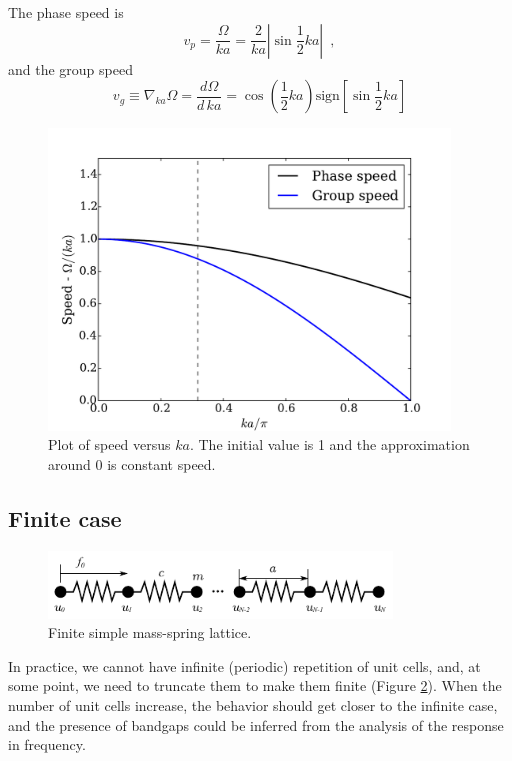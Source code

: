 \documentclass[12pt,letterpaper]{article}
\begin{document}
The phase speed is
\[v_p = \frac{\Omega}{ka} = \frac{2}{ka}\left\vert \sin \frac{1}{2} ka\right\vert \enspace ,\]
and the group speed
\[v_g \equiv \nabla_{ka}\Omega = \frac{d\Omega}{d\, ka} = \cos \left(\frac{1}{2} ka\right) \text{sign}\left[\sin \frac{1}{2} ka\right] \]

\begin{figure}[h]
\centering
\includegraphics[height=8cm]{img/spring-mass-speeds.pdf} 
\caption{Plot of speed versus $ka$. The initial value is 1 and the approximation around 0 is constant speed.}
\label{fig:spring-mass-speed}
\end{figure}



\subsection{Finite case}
\begin{figure}[h]
\centering
\includegraphics[height=1.8cm]{img/spring-mass-finite.pdf} 
\caption{Finite simple mass-spring lattice.}\label{fig:spring-mass-finite}
\end{figure}
In practice, we cannot have infinite (periodic) repetition of unit cells, and, at some point, we need to truncate them to make them finite (Figure \ref{fig:spring-mass-finite}). When the number of unit cells increase, the behavior should get closer to the infinite case, and the presence of bandgaps could be inferred from the analysis of the response in frequency.
\end{document}
